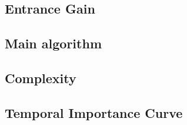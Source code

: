 \subsection{Entrance Gain}

\subsection{Main algorithm}

\subsection{Complexity}

\subsection{Temporal Importance Curve}
